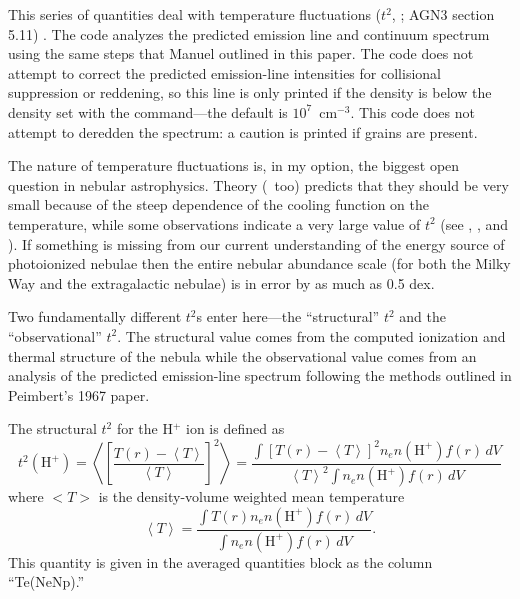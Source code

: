 This series of quantities deal with temperature fluctuations ($t^2$, \citealp{Peimbert1967}; AGN3 section 5.11) .
The code analyzes the predicted emission line
and continuum spectrum using the same steps that Manuel outlined in this
paper.
The code does not attempt to correct the predicted emission-line
intensities for collisional suppression or reddening, so this line is only
printed if the density is below the density set with the
 command---the default is $10^7$~cm$^{-3}$.
This code does not attempt to deredden the
spectrum: a caution is printed if grains are present.

The nature of temperature fluctuations is, in my option, the biggest
open question in nebular astrophysics.
Theory (\Cloudy\ too) predicts that
they should be very small because of the steep dependence of the cooling
function on the temperature, while some observations indicate a very large
value of $t^2$ (see \citealp{Liu1995}, \citealp{KingdonFerland1995}, and \citealp{Ferland2003}).
If something is missing from our current understanding of the energy source
of photoionized nebulae then the entire nebular abundance scale (for both
the Milky Way and the extragalactic nebulae) is in error by as much as 0.5
dex.

Two fundamentally different $t^2$s enter here---the ``structural''
$t^2$ and the ``observational'' $t^2$.
The structural value comes from the computed
ionization and thermal structure of the nebula while the observational value
comes from an analysis of the predicted emission-line spectrum following
the methods outlined in Peimbert's 1967 paper.

The structural $t^2$ for the H$^+$ ion is defined as
\begin{equation}
{t^2}\left( {{{\mathrm{H}}^ + }} \right) = \left\langle {{{\left[
{\frac{{T\left( r \right) - \left\langle T \right\rangle }}{{\left\langle
T \right\rangle }}} \right]}^2}} \right\rangle  = \frac{{\int {{{\left[
{T\left( r \right) - \left\langle T \right\rangle } \right]}^2}{n_e}n\left(
{{{\mathrm{H}}^ + }} \right)f\left( r \right)\,dV} }}{{{{\left\langle T
\right\rangle }^2}\int {{n_e}n\left( {{{\mathrm{H}}^ + }} \right)f\left( r
\right)\,dV} }}%
\end{equation}
where $<T>$ is the density-volume weighted mean temperature
\begin{equation}
\left\langle T \right\rangle  = \frac{{\int {T\left( r \right){n_e}n\left(
{{{\mathrm{H}}^ + }} \right)f\left( r \right)\,dV} }}{{\int {{n_e}n\left(
{{{\mathrm{H}}^ + }} \right)f\left( r \right)\,dV} }}.%
\end{equation}
This quantity is given in the averaged quantities block as the column
``Te(NeNp).''

